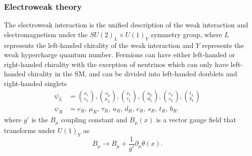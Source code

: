 \documentclass[../thesis.tex]{subfiles}
\begin{document}
\subsubsection{Electroweak theory}
The electroweak interaction is the unified description of the weak interaction and electromagnetism under the $SU(2)_L \times U(1)_Y$ symmetry group, where $L$ represents the left-handed chirality of the weak interaction and $Y$ represents the weak hypercharge quantum number.
Fermions can have either left-handed or right-handed chirality with the exception of neutrinos which can only have left-handed chirality in the \acs{SM}, and can be divided into left-handed doublets and right-handed singlets
\begin{equation}
\begin{aligned}
\psi_L &= \displaystyle\binom{\nu_e}{e_L}, \displaystyle\binom{\nu_\mu}{\mu_L}, \displaystyle\binom{\nu_\tau}{\tau_L}, \displaystyle\binom{u_L}{d_L}, \displaystyle\binom{c_L}{s_L}, \displaystyle\binom{t_L}{b_L} \\
\psi_R &= e_R\text{, }\mu_R\text{, }\tau_R\text{, }u_R\text{, }d_R\text{, }c_R\text{, }s_R\text{, }t_R\text{, }b_R.
\end{aligned}
\end{equation}
where $g'$ is the $B_\mu$ coupling constant and $B_\mu(x)$ is a vector gauge field that transforms under $U(1)_Y$ as
\begin{equation}
B_\mu \rightarrow B_\mu + \frac{1}{g'}\partial_\mu \theta(x).
\end{equation}
\end{document}
